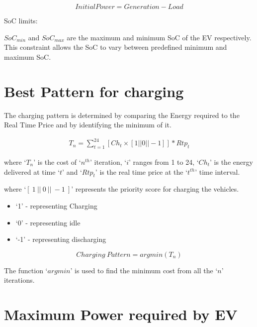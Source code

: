 \begin{equation}             
	 Initial Power = Generation - Load
\end{equation}

	  SoC limits:  
	 
	   $SoC_{min}$ and $SoC_{max}$ are  the maximum and minimum SoC of the EV respectively.
	   This constraint allows the SoC to vary between predefined minimum and maximum SoC.               
	
	\section{Best Pattern for charging}
	
	
	The charging pattern is determined by comparing the Energy required to the Real Time Price and by  identifying the minimum of it. 
	
	\begin{equation}
		\begin{split}
				T_{n} = \sum_{t=1}^{24} [Ch_{t} \times [1 || 0 || -1 ] ] \ast  Rtp_{t} 
		\end{split}
    \end{equation}	 

where `$T_{n}$' is the cost of `$n^{th}$' iteration, `$i$' ranges from 1 to 24, `$Ch_{t}$' is the energy delivered at time `$t$' and `$Rtp_{t}$' is the real time price at the `$t^{th}$' time interval.

\noindent where `$[ \ 1 \ ||\ 0 \ ||\ -1\ ]$' represents the priority score for charging the vehicles.

	\begin{itemize}
		\item `1' - representing Charging
		\item `0' - representing idle
		\item `-1' - representing discharging
	\end{itemize}

\begin{equation}
	Charging \ Pattern = argmin (T_{n})
	\label{eqn:argmin}
\end{equation}	

The function `$argmin$'  is used to find the minimum cost from all the `$n$' iterations.	

	\section{Maximum Power required by EV}
	

